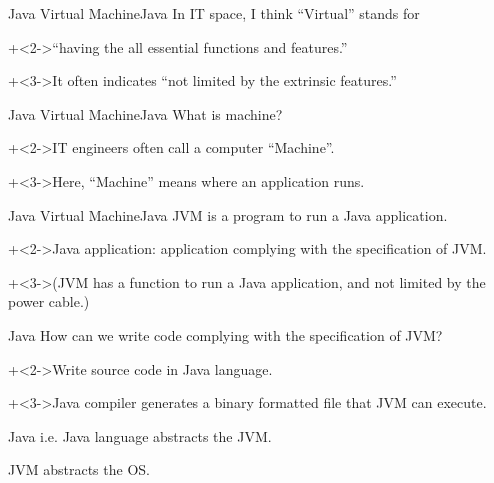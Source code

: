 \begin{frame}{Java Virtual Machine}{Java}
    In IT space, I think ``Virtual'' stands for 
    \vspace{4ex}

    \onslide+<2->{``having the all essential functions and features.''}
    \vspace{4ex}

    \onslide+<3->{It often indicates ``not limited by the extrinsic features.''}
\end{frame}


\begin{frame}{Java Virtual Machine}{Java}
    What is machine?
    \vspace{4ex}

    \onslide+<2->{IT engineers often call a computer ``Machine''.}
    \vspace{4ex}

    \onslide+<3->{Here, ``Machine'' means where an application runs.}
\end{frame}


\begin{frame}{Java Virtual Machine}{Java}
    JVM is a program to run a Java application.
    \vspace{4ex}

    \onslide+<2->{Java application: application complying with the specification of JVM.}
    \vspace{4ex}

    \onslide+<3->{(JVM has a function to run a Java application, and not limited by the power cable.)}
\end{frame}


\begin{frame}{Java}{}
    How can we write code complying with the specification of JVM?
    \vspace{4ex}

    \onslide+<2->{Write source code in Java language.}
    \vspace{4ex}

    \onslide+<3->{Java compiler generates a binary formatted file that JVM can execute.}
\end{frame}


\begin{frame}{Java}{}
    i.e. Java language abstracts the JVM.
    \vspace{4ex}

    JVM abstracts the OS.
\end{frame}


